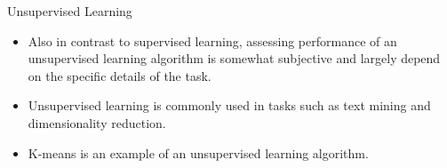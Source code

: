 \documentclass[11pt]{beamer}
\begin{document}
\begin{frame}{Unsupervised Learning}
\begin{itemize}
\item Also in contrast to supervised learning, assessing performance of an unsupervised learning algorithm is somewhat subjective and largely depend on the specific details of the task. 

\item Unsupervised learning is commonly used in tasks such as text mining and dimensionality reduction. 

\item K-means is an example of an unsupervised learning algorithm.
\end{itemize}
\end{frame}
%
\end{document}
